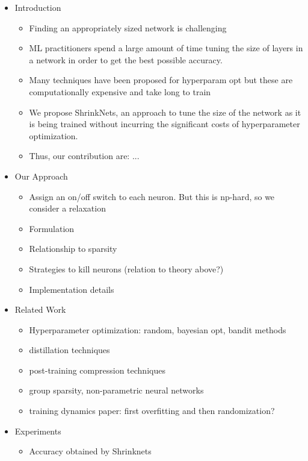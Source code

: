 \documentclass{article}
\begin{document}
\begin{itemize}
  \item Introduction
  \begin{itemize}
    \item Finding an appropriately sized network is challenging
    \item ML practitioners spend a large amount of time tuning the size of layers
    in a network in order to get the best possible accuracy.
    \item Many techniques have been proposed for hyperparam opt but these
    are computationally expensive and take long to train
    \item We propose ShrinkNets, an approach to tune the size of the network 
    as it is being trained without incurring the significant costs of 
    hyperparameter optimization. 
    \item Thus, our contribution are: ...
  \end{itemize}
  \item Our Approach
  \begin{itemize}
    \item Assign an on/off switch to each neuron. But this is np-hard, so we
    consider a relaxation
    \item Formulation
    \item Relationship to sparsity
    \item Strategies to kill neurons (relation to theory above?)
    \item Implementation details
  \end{itemize}
  \item Related Work
  \begin{itemize}
    \item Hyperparameter optimization: random, bayesian opt, bandit methods
    \item distillation techniques
    \item post-training compression techniques
    \item group sparsity, non-parametric neural networks
    \item training dynamics paper: first overfitting and then randomization?
  \end{itemize}
  \item Experiments
  \begin{itemize}
    \item Accuracy obtained by Shrinknets

\end{itemize}
\end{itemize}
\end{document}
